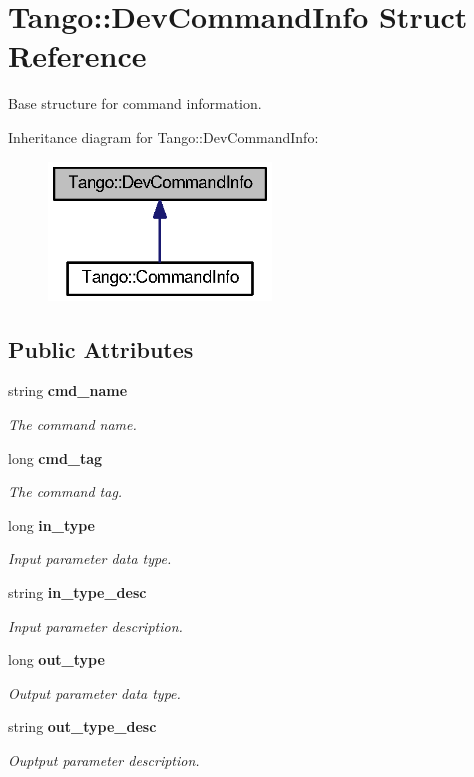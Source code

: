 \section{Tango\-:\-:Dev\-Command\-Info Struct Reference}
\label{structTango_1_1DevCommandInfo}


Base structure for command information.  




Inheritance diagram for Tango\-:\-:Dev\-Command\-Info\-:
\nopagebreak
\begin{figure}[H]
\begin{center}
\leavevmode
\includegraphics[width=168pt]{df/d77/structTango_1_1DevCommandInfo__inherit__graph}
\end{center}
\end{figure}
\subsection*{Public Attributes}
\begin{DoxyCompactItemize}
\item 
string {\bf cmd\-\_\-name}
\begin{DoxyCompactList}\small\item\em The command name. \end{DoxyCompactList}\item 
long {\bf cmd\-\_\-tag}
\begin{DoxyCompactList}\small\item\em The command tag. \end{DoxyCompactList}\item 
long {\bf in\-\_\-type}
\begin{DoxyCompactList}\small\item\em Input parameter data type. \end{DoxyCompactList}\item 
string {\bf in\-\_\-type\-\_\-desc}
\begin{DoxyCompactList}\small\item\em Input parameter description. \end{DoxyCompactList}\item 
long {\bf out\-\_\-type}
\begin{DoxyCompactList}\small\item\em Output parameter data type. \end{DoxyCompactList}\item 
string {\bf out\-\_\-type\-\_\-desc}
\begin{DoxyCompactList}\small\item\em Ouptput parameter description. \end{DoxyCompactList}\end{DoxyCompactItemize}


